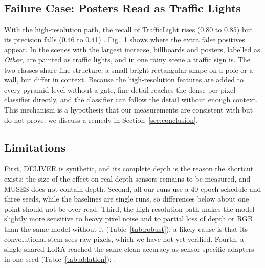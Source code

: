 \subsection{Failure Case: Posters Read as Traffic Lights}
With the high-resolution path, the recall of TrafficLight rises (0.80 to 0.85) but its precision falls (0.46 to 0.41) . Fig.~\ref{fig:failure} shows where the extra false positives appear. In the scenes with the largest increase, billboards and posters, labelled as \emph{Other}, are painted as traffic lights, and in one rainy scene a traffic sign is. The two classes share fine structure, a small bright rectangular shape on a pole or a wall, but differ in context. Because the high-resolution features are added to every pyramid level without a gate, fine detail reaches the dense per-pixel classifier directly, and the classifier can follow the detail without enough context. This mechanism is a hypothesis that our measurements are consistent with but do not prove; we discuss a remedy in Section~\ref{sec:conclusion}.

\begin{figure}[t]
\centering
\caption{}
\label{fig:failure}
\end{figure}

\subsection{Limitations}
First, DELIVER is synthetic, and its complete depth is the reason the shortcut exists; the size of the effect on real depth sensors remains to be measured, and MUSES does not contain depth. Second, all our runs use a 40-epoch schedule and three seeds, while the baselines are single runs, so differences below about one point should not be over-read. Third, the high-resolution path makes the model slightly more sensitive to heavy pixel noise and to partial loss of depth or RGB than the same model without it (Table~\ref{tab:robust}); a likely cause is that its convolutional stem sees raw pixels, which we have not yet verified. Fourth, a single shared LoRA reached the same clean accuracy as sensor-specific adapters in one seed (Table~\ref{tab:ablation}); .
